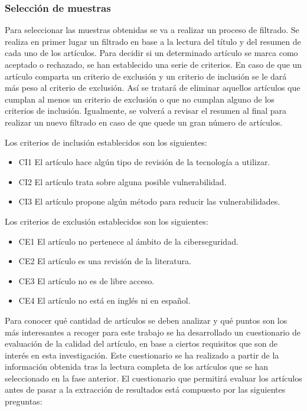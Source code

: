 \documentclass[12pt,a4paper,onecolumn,oneside]{report}
\begin{document}
\subsubsection{Selección de muestras}

Para seleccionar las muestras obtenidas se va a realizar un proceso de filtrado. Se realiza en primer lugar un filtrado en base a la lectura del título y del resumen de cada uno de los artículos. Para decidir si un determinado artículo se marca como aceptado o rechazado, se han establecido una serie de criterios. En caso de que un artículo comparta un criterio de exclusión y un criterio de inclusión se le dará más peso al criterio de exclusión. Así se tratará de eliminar aquellos artículos que cumplan al menos un criterio de exclusión o que no cumplan alguno de los criterios de inclusión. Igualmente, se volverá a revisar el resumen al final para realizar un nuevo filtrado en caso de que quede un gran número de artículos.

Los criterios de inclusión establecidos son los siguientes:
\begin{itemize}
\item CI1 El artículo hace algún tipo de revisión de la tecnología a utilizar.
\item CI2 El artículo trata sobre alguna posible vulnerabilidad.
\item CI3 El artículo propone algún método para reducir las vulnerabilidades.
\end{itemize}

Los criterios de exclusión establecidos son los siguientes:
\begin{itemize}
\item CE1 El artículo no pertenece al ámbito de la ciberseguridad.
\item CE2 El artículo es una revisión de la literatura.
\item CE3 El artículo no es de libre acceso.
\item CE4 El artículo no está en inglés ni en español.
\end{itemize}

Para conocer qué cantidad de artículos se deben analizar y qué puntos son los más interesantes a recoger para este trabajo se ha desarrollado un cuestionario de evaluación de la calidad del artículo, en base a ciertos requisitos que son de interés en esta investigación. Este cuestionario se ha realizado a partir de la información obtenida tras la lectura completa de los artículos que se han seleccionado en la fase anterior. El cuestionario que permitirá evaluar los artículos antes de pasar a la extracción de resultados está compuesto por las siguientes preguntas:
\end{document}

